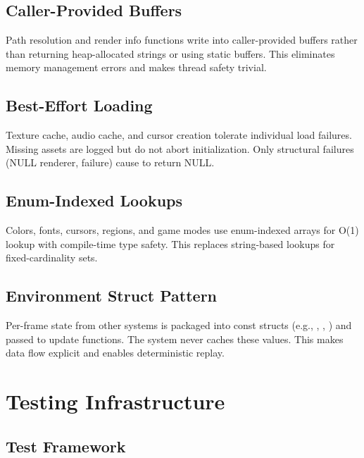 \documentclass[11pt,a4paper]{article}
\begin{document}
\subsection{Caller-Provided Buffers}
\label{sec:caller-buffers}

Path resolution and render info functions write into caller-provided buffers rather than returning heap-allocated strings or using static buffers. This eliminates memory management errors and makes thread safety trivial.

\subsection{Best-Effort Loading}
\label{sec:best-effort}

Texture cache, audio cache, and cursor creation tolerate individual load failures. Missing assets are logged but do not abort initialization. Only structural failures (NULL renderer,  failure) cause  to return NULL.

\subsection{Enum-Indexed Lookups}
\label{sec:enum-indexed}

Colors, fonts, cursors, regions, and game modes use enum-indexed arrays for O(1) lookup with compile-time type safety. This replaces string-based lookups for fixed-cardinality sets.

\subsection{Environment Struct Pattern}
\label{sec:env-struct}

Per-frame state from other systems is packaged into const structs (e.g., , , ) and passed to update functions. The system never caches these values. This makes data flow explicit and enables deterministic replay.


\section{Testing Infrastructure}
\label{sec:testing}

\subsection{Test Framework}
\label{sec:test-framework}
\end{document}
